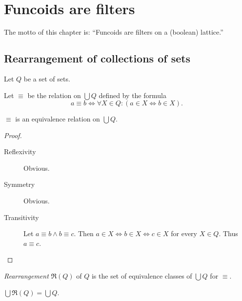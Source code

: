 
\chapter{Funcoids are filters}\label{fcd-filters}

The motto of this chapter is: ``Funcoids are filters on a (boolean) lattice.''


\section{Rearrangement of collections of sets}

Let $Q$ be a set of sets.

Let $\equiv$ be the relation on $\bigcup Q$ defined by the formula
\[
a\equiv b\Leftrightarrow\forall X\in Q:(a\in X\Leftrightarrow b\in X).
\]

\begin{prop}
$\equiv$ is an equivalence relation on $\bigcup Q$.\end{prop}
\begin{proof}
~
\begin{description}
\item [{Reflexivity}] Obvious.
\item [{Symmetry}] Obvious.
\item [{Transitivity}] Let $a\equiv b\wedge b\equiv c$. Then $a\in X\Leftrightarrow b\in X\Leftrightarrow c\in X$
for every $X\in Q$. Thus $a\equiv c$.
\end{description}
\end{proof}
\begin{defn}
\emph{Rearrangement} $\mathfrak{R}(Q)$ of $Q$ is the set of equivalence
classes of $\bigcup Q$ for $\equiv$.\end{defn}
\begin{obvious}
$\bigcup\mathfrak{R}(Q)=\bigcup Q$.
\end{obvious}

